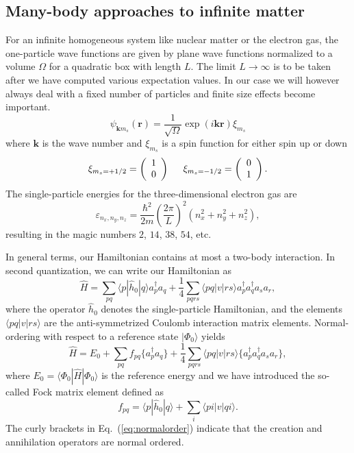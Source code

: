 \documentclass[%
oneside,                 %
final,                   %
10pt]{article}
\begin{document}
\subsection*{Many-body approaches to infinite matter}

For an infinite homogeneous system  like nuclear matter or the electron gas, 
the one-particle wave functions are given by plane wave functions
normalized to a volume $\Omega$ for a quadratic box with length
$L$. The limit $L\rightarrow \infty$ is to be taken after we
  have computed various expectation values. In our case we will
  however always deal with a fixed number of particles and finite size
  effects become important. 
\[
\psi_{\mathbf{k}m_s}(\mathbf{r})= \frac{1}{\sqrt{\Omega}}\exp{(i\mathbf{kr})}\xi_{m_s}
\]
where $\mathbf{k}$ is the wave number and $\xi_{m_s}$ is a spin function
for either spin up or down
\[ 
\xi_{m_{s}=+1/2}=\left(\begin{array}{c} 1
  \\ 0 \end{array}\right) \hspace{0.5cm}
\xi_{m_{s}=-1/2}=\left(\begin{array}{c} 0 \\ 1 \end{array}\right).\]
The single-particle energies for the three-dimensional electron gas
are
\[    
\varepsilon_{n_{x}, n_{y}, n_{z}} = \frac{\hbar^{2}}{2m}\left( \frac{2\pi }{L}\right)^{2}(n_{x}^{2}+n_{y}^{2}+n_{z}^{2}),
\]
resulting in the magic numbers $2$, $14$, $38$, $54$, etc.  

In general terms, our Hamiltonian contains at most a two-body
interaction. In second quantization, we can write our Hamiltonian as
\begin{equation}
\hat{H}= \sum_{pq}\langle p | \hat{h}_0 | q \rangle a_p^{\dagger} a_q + \frac{1}{4}\sum_{pqrs}\langle pq |v| r s \rangle a_p^{\dagger} a_q^{\dagger} a_s a_r,
\label{eq:ourHamiltonian}
\end{equation} 
where the operator $\hat{h}_0$ denotes the single-particle
Hamiltonian, and the elements $\langle pq|v|rs\rangle$ are the
anti-symmetrized Coulomb interaction matrix elements.  Normal-ordering
with respect to a reference state $|\Phi_0\rangle$ yields
\begin{equation}
\hat{H}=E_0 + \sum_{pq}f_{pq}\lbrace a_p^{\dagger} a_q\rbrace + \frac{1}{4}\sum_{pqrs}\langle pq |v| r s \rangle \lbrace a_p^{\dagger} a_q^{\dagger} a_s a_r \rbrace,
\label{eq:normalorder}
\end{equation}
where $E_0=\langle\Phi_0| \hat{H}| \Phi_0\rangle$ is the reference energy
and we have introduced the so-called  Fock matrix element defined as
\begin{equation}
f_{pq} = \langle p|\hat{h}_0| q \rangle + \sum\limits_{i} \langle pi |v| qi\rangle.
\label{eq:fockelement}
\end{equation}
The curly brackets in Eq.~(\ref{eq:normalorder}) indicate that the
creation and annihilation operators are normal ordered.
\end{document}
